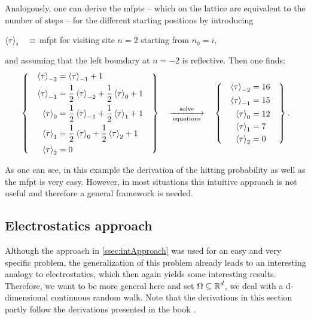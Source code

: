 Analogously, one can derive the \acp{mfpt} -- which on the lattice are equivalent to the number of steps -- for the different starting positions by introducing
\begin{center}
 $\left<\tau\right>_i \quad \equiv$ \quad \ac{mfpt} for visiting site $n=2$ starting from $n_0=i$,
\end{center}
and assuming that the left boundary at $n=-2$ is reflective. Then one finds:
\begin{equation*}
 \left\{\quad
 \begin{aligned}
  \mfpt_{-2} &= \mfpt_{-1}+1
  \\
  \mfpt_{-1} &= \frac{1}{2}\mfpt_{-2}+\frac{1}{2}\mfpt_{0}+1
  \\
  \mfpt_{0} &= \frac{1}{2}\mfpt_{-1}+\frac{1}{2}\mfpt_{1}+1
  \\
  \mfpt_{1} &= \frac{1}{2}\mfpt_{0}+\frac{1}{2}\mfpt_{2}+1
  \\
  \mfpt_{2} &= 0
 \end{aligned}
 \quad
 \right\} \quad \xlongrightarrow[\textrm{equations}]{\textrm{solve}} \quad \left\{\quad
 \begin{aligned}
  \mfpt_{-2} &= 16
  \\
  \mfpt_{-1} &= 15
  \\
  \mfpt_{0} &= 12
  \\
  \mfpt_{1} &= 7
  \\
  \mfpt_{2} &= 0
 \end{aligned}
 \quad
 \right\}.
\end{equation*}

As one can see, in this example the derivation of the hitting probability as well as the \ac{mfpt} is very easy. However, in most situations this intuitive approach is not useful and therefore a general framework is needed.

\subsection{Electrostatics approach}\label{ssec:electrostatics-approach}
Although the approach in \autoref{ssec:intApproach} was used for an easy and very specific problem, the generalization of this problem already leads to an interesting analogy to electrostatics, which then again yields some interesting results. Therefore, we want to be more general here and set $\Omega \subseteq \operatorname{\mathbb{R}}^d$, \ie we deal with a d-dimensional continuous random walk. Note that the derivations in this section partly follow the derivations presented in the book .

